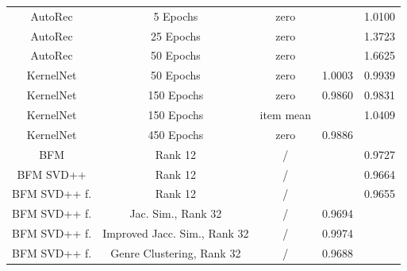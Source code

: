 \documentclass[10pt,conference,compsocconf]{IEEEtran}
\begin{document}
\begin{table}
{\begin{tabular}{|| c | c | c | c | c ||}
                \hline
                AutoRec              & 5 Epochs                              & zero                    &                        & 1.0100                  \\
                AutoRec              & 25 Epochs                             & zero                    &                        & 1.3723                  \\
                AutoRec              & 50 Epochs                             & zero                    &                        & 1.6625                  \\
                \hline
                KernelNet            & 50 Epochs                             & zero                    & 1.0003                 & 0.9939                  \\
                KernelNet            & 150 Epochs                            & zero                    & 0.9860                 & 0.9831                  \\
                KernelNet            & 150 Epochs                            & item mean               &                        & 1.0409                  \\
                KernelNet            & 450 Epochs                            & zero                    & 0.9886                 &                         \\
                \hline
                BFM                  & Rank 12                               & /                       &                        & 0.9727                  \\
                BFM SVD++            & Rank 12                               & /                       &                        & 0.9664                  \\
                BFM SVD++ f.         & Rank 12                               & /                       &                        & 0.9655                  \\
                BFM SVD++ f.         & Jac. Sim., Rank 32                    & /                       & 0.9694                 &                         \\
                BFM SVD++ f.         & Improved Jacc. Sim., Rank 32          & /                       & 0.9974                 &                         \\
                BFM SVD++ f.         & Genre Clustering, Rank 32             & /                       & 0.9688                 &                         \\

\end{tabular}}
\end{table}
\end{document}
